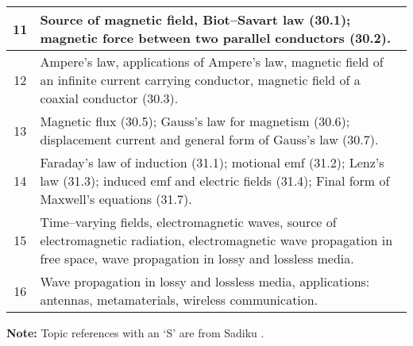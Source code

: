 \documentclass[12pt,a4paper]{article}
\begin{document}
\begin{center}
\begin{longtable}{|c|p{13cm}|}
		\hline
		11 \rule{0pt}{2.6ex} & Source of magnetic field, Biot--Savart law (30.1); magnetic force between two parallel conductors (30.2).\\
		\hline
		12 \rule{0pt}{2.6ex} & Ampere's law, applications of Ampere's law, magnetic field of an infinite current carrying conductor, magnetic field of a coaxial conductor (30.3).\\
		\hline
		13 \rule{0pt}{2.6ex} & Magnetic flux (30.5); Gauss's law for magnetism (30.6); displacement current and general form of Gauss's law (30.7).\\
		\hline
		14 \rule{0pt}{2.6ex} & Faraday's law of induction (31.1); motional emf (31.2); Lenz's law (31.3); induced emf and electric fields (31.4); Final form of Maxwell's equations (31.7).\\
		\hline
		15 \rule{0pt}{2.6ex} & Time--varying fields, electromagnetic waves, source of electromagnetic radiation, electromagnetic wave propagation in free space, wave propagation in lossy and lossless media.\\
		\hline
		16 \rule{0pt}{2.6ex} & Wave propagation in lossy and lossless media, applications: antennas, metamaterials, wireless communication.\\
	\hline \hline
	\end{longtable}
\end{center}
\noindent \textbf{Note:} Topic references with an `S' are from Sadiku \cite{Sadiku}.
\end{document}
